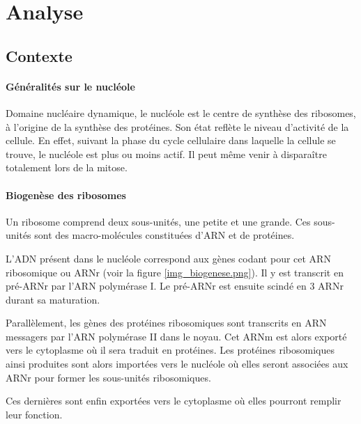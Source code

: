 \chapter{Analyse}

\section{Contexte}

\subsubsection{Généralités sur le nucléole}

Domaine nucléaire dynamique, le nucléole est le centre de synthèse des
ribosomes, à l'origine de la synthèse des protéines. Son état reflète
le niveau d'activité de la cellule. En effet, suivant la phase du
cycle cellulaire dans laquelle la cellule se trouve, le nucléole est
plus ou moins actif. Il peut même venir à disparaître totalement lors
de la mitose.

\subsubsection{Biogenèse des ribosomes}

Un ribosome comprend deux sous-unités, une petite et une grande. Ces
sous-unités sont des macro-molécules constituées d'ARN et de
protéines.

L'ADN présent dans le nucléole correspond aux gènes codant pour cet
ARN ribosomique ou ARNr (voir la figure \ref{img_biogenese.png}). Il y
est transcrit en pré-ARNr par l'ARN polymérase I. Le pré-ARNr est
ensuite scindé en 3 ARNr durant sa maturation.

Parallèlement, les gènes des protéines ribosomiques sont transcrits en
ARN messagers par l'ARN polymérase II dans le noyau. Cet ARNm est
alors exporté vers le cytoplasme où il sera traduit en protéines.  Les
protéines ribosomiques ainsi produites sont alors importées vers le
nucléole où elles seront associées aux ARNr pour former les
sous-unités ribosomiques.

Ces dernières sont enfin exportées vers le cytoplasme où elles
pourront remplir leur fonction.


